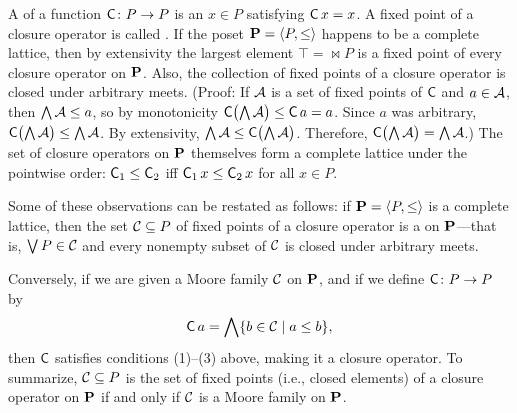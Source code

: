 A  of a
function $\operatorname{\mathsf{C}} \colon  P \to P$ is an $x\in P$ satisfying $\operatorname{\mathsf{C}} x = x$.
A fixed point of a closure operator is called .
If the poset $\mathbf{P} = \langle P, \leq\rangle$ happens to be a complete lattice,
then by extensivity the largest element $\top = \Join P$ is
a fixed point of every closure operator on $\mathbf{P}$.
Also, the collection of fixed points of a closure operator is closed under arbitrary meets.
(Proof: If $\mathcal{A}$ is a set of fixed points of $\operatorname{\mathsf{C}}$ and  
$a \in \mathcal{A}$, then $\bigwedge \mathcal{A} \leq a$, so by monotonicity
$\operatorname{\mathsf{C}} \bigl( \bigwedge \mathcal{A} \bigr) \leq \operatorname{\mathsf{C}} a = a$. 
Since $a$ was arbitrary,
$\operatorname{\mathsf{C}} \bigl( \bigwedge \mathcal{A} \bigr) \leq  \bigwedge \mathcal{A}$.
By extensivity,
$\bigwedge \mathcal{A} \leq \operatorname{\mathsf{C}} \bigl( \bigwedge \mathcal{A}\bigr)$. %
Therefore, $\operatorname{\mathsf{C}} \bigl( \bigwedge \mathcal{A} \bigr) =  \bigwedge \mathcal{A}$.)
The set of closure operators on $\mathbf{P}$
themselves form a complete lattice under the pointwise
order: $\operatorname{\mathsf{C}}_1 \leq  \operatorname{\mathsf{C}}_2$ iff $\operatorname{\mathsf{C}}_1 x \leq  \operatorname{\mathsf{C}}_2 x$ for all $x \in P$. 

Some of these observations can be restated as follows:
if $\mathbf{P} = \langle P, \leq\rangle$ is a complete lattice,
then the set $\mathcal{C} \subseteq P$ of fixed points of a closure operator
is a  on $\mathbf{P}$---that is, 
$\bigvee P \in \mathcal{C}$ and every nonempty subset of $\mathcal{C}$ is closed under arbitrary meets.


Conversely, if we are given a Moore family $\mathcal{C}$ on $\mathbf{P}$, and if we define 
$\operatorname{\mathsf{C}} \colon P \to P$ by
\[
\operatorname{\mathsf{C}} a = \bigwedge \{b \in \mathcal{C} \mid a\leq b\},
\]
then $\operatorname{\mathsf{C}}$ satisfies conditions (1)--(3)
above, making it a closure operator.
To summarize, $\mathcal{C} \subseteq P$ is the set of fixed points (i.e., closed elements)
of a closure operator on
$\mathbf{P}$ if and only if $\mathcal{C}$ is a Moore family on $\mathbf{P}$.

